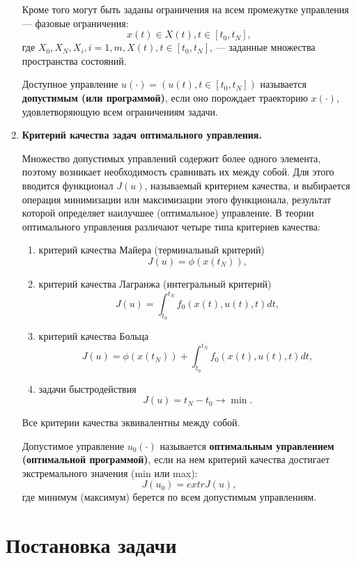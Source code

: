 \begin{enumerate}
Кроме того могут быть заданы ограничения на всем промежутке управления — фазовые ограничения:
\begin{equation} 
	x(t) \in X(t), t \in [t_0 , t_N ],
	\label{eq:ti}
\end{equation}
где $X_0 , X_N , X_i , i = 1, m, X(t), t \in [t_0 , t_N ]$, — заданные множества пространства состояний.

Доступное управление $u(·) = (u(t), t \in [t_0 , t_N ])$ называется \textbf{допустимым (или программой)}, если оно порождает траекторию $x(·)$, удовлетворяющую всем ограничениям задачи.
    
    
    \item \textbf{Критерий качества задач оптимального управления.}

 Множество допустимых управлений  содержит более одного элемента, поэтому возникает необходимость сравнивать их между собой. Для этого вводится функционал $J(u)$, называемый критерием качества, и выбирается операция минимизации или максимизации этого функционала, результат которой определяет наилучшее (оптимальное) управление. В теории оптимального управления различают четыре типа критериев качества:
\begin{enumerate}
    \item критерий качества Майера (терминальный критерий)
    $$J(u) = \phi(x(t_N)),$$
    \item критерий качества Лагранжа (интегральный критерий)
    $$ J(u) = \int_{t_0}^{t_N}f_0(x(t),u(t),t)dt,$$
    \item критерий качества Больца
    \begin{equation}
    	J(u) = \phi(x(t_N)) + \int_{t_0}^{t_N}f_0(x(t),u(t),t)dt,
    	\label{eq:bolt}
    \end{equation}
    \item задачи быстродействия
    $$J(u)=t_N - t_0 \rightarrow \min.$$
\end{enumerate}
Все критерии качества эквивалентны между собой.

Допустимое управление $u_0 (·)$ называется \textbf{оптимальным управлением (оптимальной программой)}, если на нем критерий качества достигает экстремального значения (min или max): $$J(u_0) = extr J(u),$$
где минимум (максимум) берется по всем допустимым управлениям.

\end{enumerate}



\section{Постановка задачи}\label{1sec:task}

